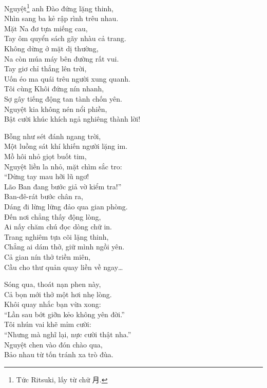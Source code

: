 \documentclass[../main.tex]{subfiles}
\begin{document}
\begin{center}
  Nguyệt\footnote{Tức Ritsuki, lấy từ chữ 月.} anh Đào đứng lặng thinh,\\
  Nhìn sang ba kẻ rập rình trêu nhau.\\
  Mặt Na đơ tựa miếng cau,\\
  Tay ôm quyển sách gãy nhàu cả trang.\\
  Không dừng ở mặt dị thường,\\
  Na còn múa máy bên đường rất vui.\\
  Tay giơ chỉ thẳng lên trời,\\
  Uốn éo ma quái trêu người xung quanh.\\
  Tôi cùng Khôi đứng nín nhanh,\\
  Sợ gây tiếng động tan tành chốn yên.\\
  Nguyệt kia không nén nổi phiền,\\
  Bật cười khúc khích ngả nghiêng thành lời!


  Bỗng như sét đánh ngang trời,\\
  Một luồng sát khí khiến người lặng im.\\
  Mồ hôi nhỏ giọt buốt tim,\\
  Nguyệt liền la nhỏ, mặt chìm sắc tro:\\
  ``Dừng tay mau hỡi lũ ngơ!\\
  Lão Ban đang bước giả vờ kiểm tra!''\\
  Ban-đê-rát bước chân ra,\\
  Dáng đi lừng lững đảo qua gian phòng.\\
  Đến nơi chẳng thấy động lòng,\\
  Ai nấy chăm chú đọc dòng chữ in.\\
  Trang nghiêm tựa cõi lặng thinh,\\
  Chẳng ai dám thở, giữ mình ngồi yên.\\
  Cả gian nín thở triền miên,\\
  Cầu cho thư quản quay liền về ngay\dots

  Sóng qua, thoát nạn phen này,\\
  Cả bọn mới thở một hơi nhẹ lòng.\\
  Khôi quay nhắc bạn vừa xong:\\
  ``Lần sau bớt giỡn kẻo không yên đời.''\\
  Tôi nhún vai khẽ mỉm cười:\\
  ``Nhưng mà nghĩ lại, nực cười thật nha.''\\
  Nguyệt chen vào đón chào qua,\\
  Bảo nhau từ tốn tránh xa trò đùa.


\end{center}
\end{document}
